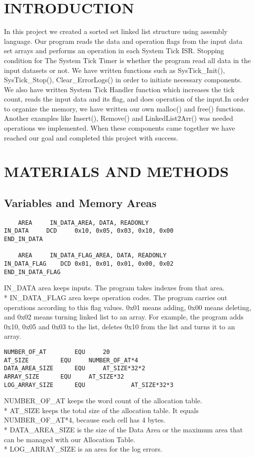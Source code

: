 \documentclass[pdftex,12pt,a4paper]{article}
\begin{document}
\section{INTRODUCTION}
In this project we created a sorted set linked list structure using assembly language. Our program reads the data and operation flags from the input data set arrays and performs an operation in each System Tick ISR. Stopping condition for The System Tick Timer is whether the program read all data in the input datasets or not. We have written functions such as SysTick\_Init(), SysTick\_Stop(), Clear\_ErrorLogs() in order to initiate necessary components. We also have written System Tick Handler function which increases the tick count, reads the input data and its flag, and does operation of the input.In order to organize the memory, we have written our own malloc() and free() functions. Another examples like Insert(), Remove() and LinkedList2Arr() was needed operations we implemented. When these components came together we have reached our goal and completed this project with success.\\ 





\section{MATERIALS AND METHODS\cite{guide}}
\subsection{Variables and Memory Areas}
\begin{lstlisting}
	AREA     IN_DATA_AREA, DATA, READONLY
IN_DATA	    DCD	    0x10, 0x05, 0x03, 0x10, 0x00
END_IN_DATA

	AREA     IN_DATA_FLAG_AREA, DATA, READONLY
IN_DATA_FLAG    DCD	0x01, 0x01, 0x01, 0x00, 0x02
END_IN_DATA_FLAG
\end{lstlisting}
IN\_DATA area keeps inputs. The program takes indexes from that area.\\*
IN\_DATA\_FLAG area keeps operation codes. The program carries out operations according to this flag values. 0x01 means adding, 0x00 means deleting, and 0x02 means turning linked list to an array. For example, the program adds 0x10, 0x05 and 0x03 to the list, deletes 0x10 from the list and turns it to an array. 
\begin{lstlisting}
NUMBER_OF_AT    	EQU		20
AT_SIZE			EQU		NUMBER_OF_AT*4
DATA_AREA_SIZE  	EQU		AT_SIZE*32*2
ARRAY_SIZE		EQU		AT_SIZE*32
LOG_ARRAY_SIZE  	EQU             AT_SIZE*32*3
\end{lstlisting}
NUMBER\_OF\_AT keeps the word count of the allocation table.\\* 
AT\_SIZE keeps the total size of the allocation table. It equals NUMBER\_OF\_AT*4, because each cell has 4 bytes.\\*
DATA\_AREA\_SIZE is the size of the Data Area or the maximum area that can be managed with our Allocation Table.\\*
LOG\_ARRAY\_SIZE is an area for the log errors.
\end{document}
